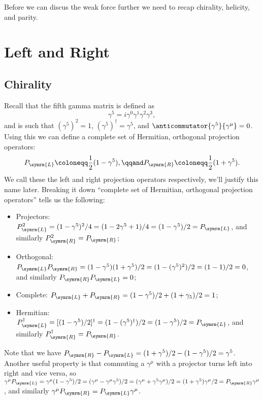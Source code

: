 \documentclass[fleqn]{NotesClass}
\newcommand{\hermit}{\dagger}
\newcommand{\Left}{\symrm{L}}
\newcommand{\Right}{\symrm{R}}
\begin{document}
    Before we can discus the weak force further we need to recap chirality, helicity, and parity.
    
    \chapter{Left and Right}
    \section{Chirality}
    Recall that the fifth gamma matrix is defined as
    \begin{equation}
        \gamma^5 = i\gamma^0 \gamma^1 \gamma^2 \gamma^3,
    \end{equation}
    and is such that \((\gamma^5)^2 = 1\), \((\gamma^5)^\hermit = \gamma^5\), and \(\anticommutator{\gamma^5}{\gamma^\mu} = 0\).
    Using this we can define a complete set of Hermitian, orthogonal projection operators:
    \begin{equation}
        P_{\Left} \coloneqq \frac{1}{2}(1 - \gamma^5), \qqand P_{\Right} \coloneqq \frac{1}{2}(1 + \gamma^5).
    \end{equation}
    We call these the left and right projection operators respectively, we'll justify this name later.
    Breaking it down \enquote{complete set of Hermitian, orthogonal projection operators} tells us the following:
    \begin{itemize}
        \item Projectors: \(P_{\Left}^2 = (1 - \gamma^5)^2/4 = (1 - 2\gamma^5 + 1)/4 = (1 - \gamma^5)/2 = P_{\Left}\), and similarly \(P_{\Right}^2 = P_{\Right}\);
        \item Orthogonal: \(P_{\Left}P_{\Right} = (1 - \gamma^5)(1 + \gamma^5)/2 = (1 - (\gamma^5)^2)/2 = (1 - 1)/2 = 0\), and similarly \(P_{\Right}P_{\Left} = 0\);
        \item Complete: \(P_{\Left} + P_{\Right} = (1 - \gamma^5)/2 + (1 + \gamma_5)/2 = 1\);
        \item Hermitian: \(P_{\Left}^\hermit = [(1 - \gamma^5)/2]^{\hermit} = (1 - (\gamma^5)^\hermit)/2 = (1 - \gamma^5)/2 = P_{\Left}\), and similarly \(P_{\Right}^\hermit = P_{\Right}\).
    \end{itemize}
    Note that we have \(P_{\Right} - P_{\Left} = (1 + \gamma^5)/2 - (1 - \gamma^5)/2 = \gamma^5\).
    Another useful property is that commuting a \(\gamma^\mu\) with a projector turns left into right and vice versa, so \(\gamma^\mu P_{\Left} = \gamma^\mu(1 - \gamma^5)/2 = (\gamma^\mu - \gamma^\mu \gamma^5)/2 = (\gamma^\mu + \gamma^5 \gamma^\mu)/2 = (1 + \gamma^5)\gamma^\mu/2 = P_{\Right}\gamma^\mu\), and similarly \(\gamma^\mu P_{\Right} = P_{\Left}\gamma^\mu\).
    
\end{document}
